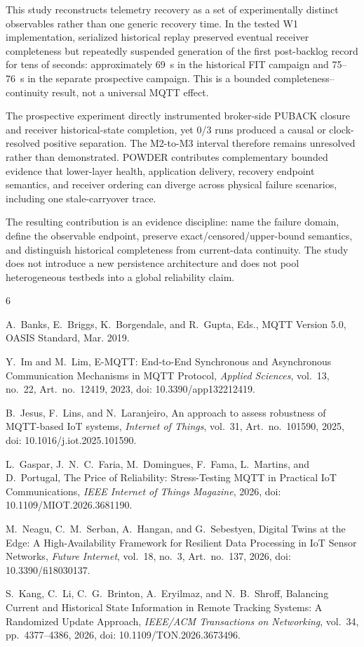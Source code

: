 \documentclass[journal]{IEEEtran}
\begin{document}
This study reconstructs telemetry recovery as a set of experimentally distinct observables rather than one generic recovery time. In the tested W1 implementation, serialized historical replay preserved eventual receiver completeness but repeatedly suspended generation of the first post-backlog record for tens of seconds: approximately 69~s in the historical FIT campaign and 75--76~s in the separate prospective campaign. This is a bounded completeness--continuity result, not a universal MQTT effect.

The prospective experiment directly instrumented broker-side PUBACK closure and receiver historical-state completion, yet 0/3 runs produced a causal or clock-resolved positive separation. The M2-to-M3 interval therefore remains unresolved rather than demonstrated. POWDER contributes complementary bounded evidence that lower-layer health, application delivery, recovery endpoint semantics, and receiver ordering can diverge across physical failure scenarios, including one stale-carryover trace.

The resulting contribution is an evidence discipline: name the failure domain, define the observable endpoint, preserve exact/censored/upper-bound semantics, and distinguish historical completeness from current-data continuity. The study does not introduce a new persistence architecture and does not pool heterogeneous testbeds into a global reliability claim.

\begin{thebibliography}{6}

A.~Banks, E.~Briggs, K.~Borgendale, and R.~Gupta, Eds.,
MQTT Version 5.0, OASIS Standard, Mar. 2019.

Y.~Im and M.~Lim,
E-MQTT: End-to-End Synchronous and Asynchronous Communication Mechanisms in MQTT Protocol,
\emph{Applied Sciences}, vol.~13, no.~22, Art.~no.~12419, 2023,
doi: 10.3390/app132212419.

B.~Jesus, F.~Lins, and N.~Laranjeiro,
An approach to assess robustness of MQTT-based IoT systems,
\emph{Internet of Things}, vol.~31, Art.~no.~101590, 2025,
doi: 10.1016/j.iot.2025.101590.

L.~Gaspar, J.~N.~C.~Faria, M.~Domingues, F.~Fama, L.~Martins, and D.~Portugal,
The Price of Reliability: Stress-Testing MQTT in Practical IoT Communications,
\emph{IEEE Internet of Things Magazine}, 2026,
doi: 10.1109/MIOT.2026.3681190.

M.~Neagu, C.~M.~Serban, A.~Hangan, and G.~Sebestyen,
Digital Twins at the Edge: A High-Availability Framework for Resilient Data Processing in IoT Sensor Networks,
\emph{Future Internet}, vol.~18, no.~3, Art.~no.~137, 2026,
doi: 10.3390/fi18030137.

S.~Kang, C.~Li, C.~G.~Brinton, A.~Eryilmaz, and N.~B.~Shroff,
Balancing Current and Historical State Information in Remote Tracking Systems: A Randomized Update Approach,
\emph{IEEE/ACM Transactions on Networking}, vol.~34, pp.~4377--4386, 2026,
doi: 10.1109/TON.2026.3673496.

\end{thebibliography}
\end{document}
